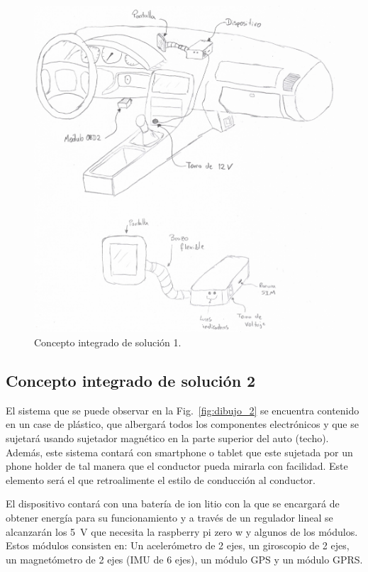\begin{figure}[htb!]
\centering
\includegraphics[width=\textwidth]{Dibujo_1.pdf}
\caption{Concepto integrado de solución 1.}
\label{fig:dibujo_1}
\end{figure}

\subsection{Concepto integrado de solución 2}
El sistema que se puede observar en la Fig.~\ref{fig:dibujo_2} se encuentra contenido en un case de plástico, que albergará todos los componentes electrónicos y que se sujetará usando sujetador magnético en la parte superior del auto (techo). Además, este sistema contará con smartphone o tablet que este sujetada por un phone holder de tal manera que el conductor pueda mirarla con facilidad. Este elemento será el que retroalimente el estilo de conducción al conductor.

El dispositivo contará con una batería de ion litio con la que se encargará de obtener energía para su funcionamiento y a través de un regulador lineal se alcanzarán los \SI{5}{V} que necesita la raspberry pi zero w y algunos de los módulos. Estos módulos consisten en: Un acelerómetro de 2 ejes, un giroscopio de 2 ejes, un magnetómetro de 2 ejes (IMU de 6 ejes), un módulo GPS y un módulo GPRS.

